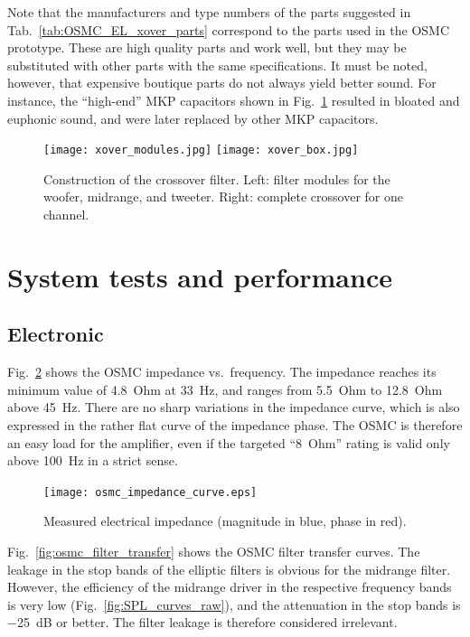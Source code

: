 \documentclass[12pt,a4paper]{article}
\providecommand{\figr}[1]{Fig.~\ref{fig:#1}}
\providecommand{\figlabel}[1]{\label{fig:#1}}
\providecommand{\tabl}[1]{Tab.~\ref{tab:#1}}
\begin{document}
Note that the manufacturers and type numbers of the parts suggested in \tabl{OSMC_EL_xover_parts} correspond to the parts used in the OSMC prototype. These are high quality parts and work well, but they may be substituted with other parts with the same specifications. It must be noted, however, that expensive boutique parts do not always yield better sound. For instance, the ``high-end'' MKP capacitors shown in \figr{osmc_xover_construction} resulted in bloated and euphonic sound, and were later replaced by other MKP capacitors.\cite{MKPtypes}

\begin{figure}[tbp]
	\centering
	\texttt{[image: xover\_modules.jpg]}
	\hfill
	\texttt{[image: xover\_box.jpg]}
	\caption{Construction of the crossover filter. Left: filter modules for the woofer, midrange, and tweeter. Right: complete crossover for one channel.}
	\figlabel{osmc_xover_construction}
\end{figure}


\section{System tests and performance}

\subsection{Electronic}
\figr{osmc_impedance_curve} shows the OSMC impedance vs.\ frequency. The impedance reaches its minimum value of \SI{4.8}{Ohm} at \SI{33}{Hz}, and ranges from \SI{5.5}{Ohm} to \SI{12.8}{Ohm} above \SI{45}{Hz}. There are no sharp variations in the impedance curve, which is also expressed in the rather flat curve of the impedance phase. The OSMC is therefore an easy load for the amplifier, even if the targeted ``\SI{8}{Ohm}'' rating\cite{osmc_p904} is valid only above \SI{100}{Hz} in a strict sense.

\begin{figure}[tbp]
	\centering
	\texttt{[image: osmc\_impedance\_curve.eps]}
	\caption{Measured electrical impedance (magnitude in blue, phase in red).}
	\figlabel{osmc_impedance_curve}
\end{figure}

\figr{osmc_filter_transfer} shows the OSMC filter transfer curves. The leakage in the stop bands of the elliptic filters is obvious for the midrange filter. However, the efficiency of the midrange driver in the respective frequency bands is very low (\figr{SPL_curves_raw}), and the attenuation in the stop bands is \SI{-25}{dB} or better. The filter leakage is therefore considered irrelevant.
\end{document}

